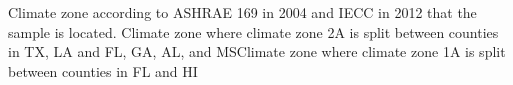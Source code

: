 Climate zone according to ASHRAE 169 in 2004 and IECC in 2012 that the sample is located. Climate zone where climate zone 2A is split between counties in TX, LA and FL, GA, AL, and MSClimate zone where climate zone 1A is split between counties in FL and HI
